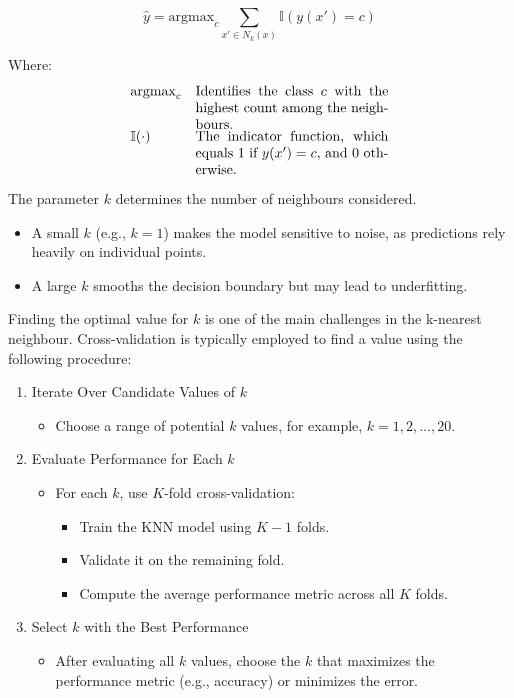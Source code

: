 		$$
		\hat{y} = \text{argmax}_c \sum_{x' \in N_k(x)} \mathbb{I}(y(x') = c)
		$$
		
		Where:
		$$
		\begin{array}{ll}
			\text{argmax}_c & \parbox[t]{0.4\textwidth}{Identifies the class $c$ with the highest count among the neighbours.} \\
			\mathbb{I}(\cdot) & \parbox[t]{0.4\textwidth}{The indicator function, which equals  1 if  $y(x') = c$,  and 0 otherwise.}
		\end{array}
		$$

		
		The parameter $k$ determines the number of neighbours considered.
		
		\begin{itemize}
			\item A small $k$ (e.g., $k = 1$) makes the model sensitive to noise, as predictions rely heavily on individual points.
			\item A large $k$ smooths the decision boundary but may lead to underfitting.
		\end{itemize}
				
		Finding the optimal value for $k$ is one of the main challenges in the k-nearest neighbour. Cross-validation is typically employed to find a value using the following procedure:
		
		\bigskip
		\begin{enumerate}
			\item Iterate Over Candidate Values of $k$
			\begin{itemize}
				\item Choose a range of potential $k$ values, for example, $k = 1, 2, \dots, 20$.
			\end{itemize}
			
			\item Evaluate Performance for Each $k$
			\begin{itemize}
				\item For each $k$, use $K$-fold cross-validation:
				\begin{itemize}
					\item Train the KNN model using $K-1$ folds.
					\item Validate it on the remaining fold.
					\item Compute the average performance metric across all $K$ folds.
				\end{itemize}
			\end{itemize}
			
			\item Select $k$ with the Best Performance
			\begin{itemize}
				\item After evaluating all $k$ values, choose the $k$ that maximizes the performance metric (e.g., accuracy) or minimizes the error.
			\end{itemize}
		\end{enumerate}
		\bigskip
		
